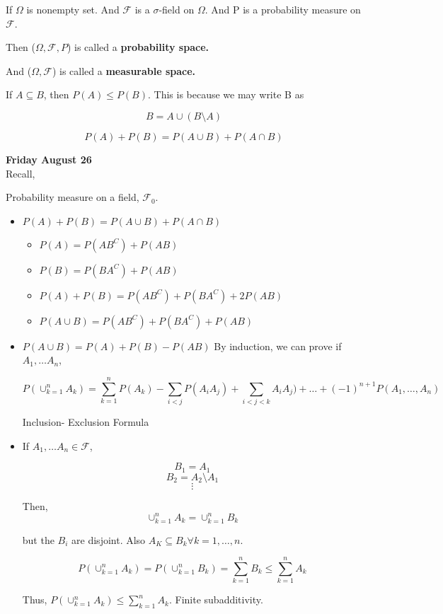 \documentclass[11pt,fleqn]{book} %
\begin{document}
If $\Omega$ is nonempty set. 
And $\mathscr{F}$ is a $\sigma$-field on $\Omega$.
And P is a probability measure on $\mathscr{F}$.

Then ($\Omega, \mathscr{F}, P$) is called a \textbf{probability space.}

And ($\Omega, \mathscr{F}$) is called a \textbf{measurable space.}


\begin{remark}
	If $A \subseteq B$, then $P(A) \leq P(B)$. This is because we may write B as

	$$B = A \cup (B\setminus A) $$
\end{remark}

\begin{remark}
	$$P(A) + P(B) = P(A\cup B) + P(A \cap B)$$


\end{remark}

\textbf{Friday August 26}
\\

Recall, 

Probability measure on a field, $\mathscr{F}_0$.

\begin{itemize}
	\item $P(A) + P(B) = P(A\cup B) + P(A \cap B)$

	\begin{itemize}
		\item $P(A) = P(AB^C) + P(A B)$
		\item $P(B) = P(B A^C) + P(AB)$
		\item $P(A) + P(B) = P(AB^C) + P(BA^C) + 2P(AB)$
		\item $P(A \cup B) = P(AB^C) + P(BA^C) + P(AB)$ 
	\end{itemize}
	
	\item $P(A \cup B) = P(A) + P(B) - P(AB)$
		By induction, we can prove if $A_1, \dots A_n$,

		$$P(\displaystyle \cup^n_{k=1} A_k) = \displaystyle \sum^n_{k=1} P(A_k) - \displaystyle \sum_{i<j} P(A_iA_j) +
		\displaystyle \sum_{i<j<k} A_iA_j) + \dots + (-1)^{n+1} P(A_1, \dots, A_n)  $$

		Inclusion- Exclusion Formula

	\item If $A_1, \dots A_n \in \mathscr{F}$,

		$$B_1 = A_1 $$
		$$B_2 = A_2 \setminus A_1$$
		$$\vdots $$

		Then, 
		$$\displaystyle \cup^n_{k=1} A_k = \displaystyle \cup^n_{k=1} B_k $$

		but the $B_i$ are disjoint. Also $A_K \subseteq B_k \forall k=1, \dots, n$.

		$$ P(\displaystyle \cup^n_{k=1} A_k) = P(\displaystyle \cup^n_{k=1} B_k) = \displaystyle \sum^n_{k=1} B_k \leq \displaystyle \sum^n_{k=1} A_k$$

		Thus, $P(\displaystyle \cup^n_{k=1} A_k) \leq \displaystyle \sum^n_{k=1} A_k$. Finite subadditivity. 

\end{itemize}
\end{document}
